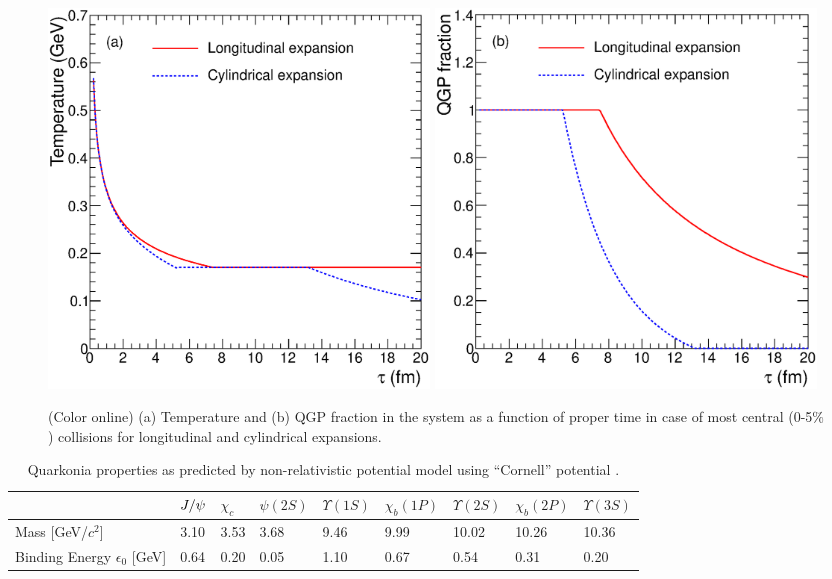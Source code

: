 \documentclass[aps,prc,preprint,superscriptaddress,showpacs,showkeys]{revtex4-1}
\begin{document}
\begin{figure}
\includegraphics[width=0.49\textwidth]{Figures/Fig1a_TauVsTemp.eps}
\includegraphics[width=0.49\textwidth]{Figures/Fig1b_TauVsFQGP.eps}
\caption{(Color online) (a) Temperature and (b) QGP fraction in the system as a function of proper 
time in case of most central (0-5$\%$) collisions for longitudinal and cylindrical expansions.}
\label{fig:TauVsTemp}
\end{figure}





\begin{table}
\caption[]{Quarkonia properties as predicted by non-relativistic potential model using 
``Cornell'' potential \cite{Karsch:1987pv}.}
\label{Tab:QuarkoniaProperties}
\begin{tabular}{l|l|l|l|l|l|l|l|l} 
\hline   
\hline
    &$J/\psi$  &$\chi_c$  &$\psi(2S)$ &$\Upsilon(1S)$ &$\chi_b(1P)$ &$\Upsilon(2S)$ &$\chi_b(2P)$ &$\Upsilon(3S)$ \\ 
\hline 
Mass [GeV/$c^2$]                      &3.10     &3.53  &3.68  &9.46  &9.99  &10.02  &10.26   &10.36 \\
Binding Energy $\epsilon_{0}$ [GeV]                  &0.64     &0.20  &0.05  &1.10  &0.67  &0.54   &0.31    &0.20 \\
\hline
\hline
\end{tabular}
\end{table}
\end{document}
